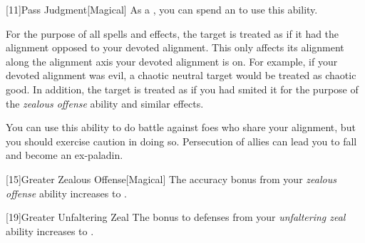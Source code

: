             [11]{Pass Judgment}[Magical] As a , you can spend an  to use this ability.
            \begin{ability}
                \begin{spelltargetinginfo}
                \end{spelltargetinginfo}
                \begin{spelleffects}
                    \spelleffect For the purpose of all spells and effects, the target is treated as if it had the alignment opposed to your devoted alignment.
                    This only affects its alignment along the alignment axis your devoted alignment is on.
                    For example, if your devoted alignment was evil, a chaotic neutral target would be treated as chaotic good.
                    In addition, the target is treated as if you had smited it for the purpose of the \textit{zealous offense} ability and similar effects.

                    You can use this ability to do battle against foes who share your alignment, but you should exercise caution in doing so.
                    Persecution of allies can lead you to fall and become an ex-paladin.
                \end{spelleffects}
            \end{ability}

            [15]{Greater Zealous Offense}[Magical]
            The accuracy bonus from your \textit{zealous offense} ability increases to .

            [19]{Greater Unfaltering Zeal}
            The bonus to defenses from your \textit{unfaltering zeal} ability increases to .



